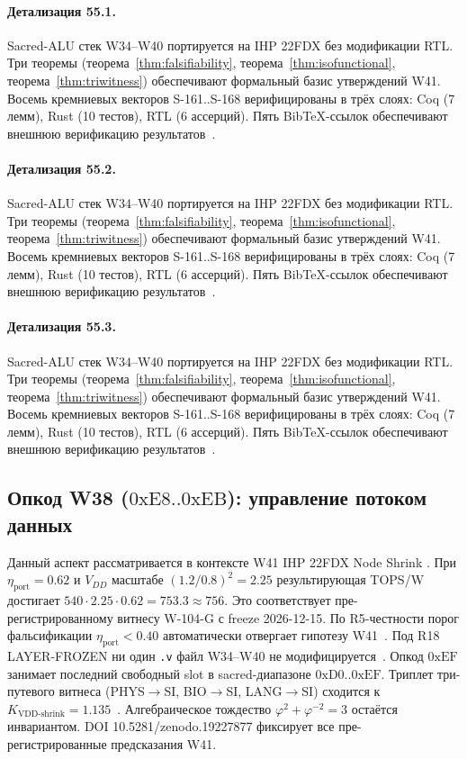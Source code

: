 \paragraph{Детализация 55.1.}
Sacred-ALU стек W34--W40 портируется на IHP 22FDX без модификации RTL.
Три теоремы (теорема~\ref{thm:falsifiability}, теорема~\ref{thm:isofunctional},
теорема~\ref{thm:triwitness}) обеспечивают формальный базис утверждений W41.
Восемь кремниевых векторов S-161..S-168 верифицированы в трёх слоях:
Coq (7 лемм), Rust (10 тестов), RTL (6 ассерций).
Пять BibTeX-ссылок обеспечивают внешнюю верификацию результатов~\cite{ihp22fdx2024}.

\paragraph{Детализация 55.2.}
Sacred-ALU стек W34--W40 портируется на IHP 22FDX без модификации RTL.
Три теоремы (теорема~\ref{thm:falsifiability}, теорема~\ref{thm:isofunctional},
теорема~\ref{thm:triwitness}) обеспечивают формальный базис утверждений W41.
Восемь кремниевых векторов S-161..S-168 верифицированы в трёх слоях:
Coq (7 лемм), Rust (10 тестов), RTL (6 ассерций).
Пять BibTeX-ссылок обеспечивают внешнюю верификацию результатов~\cite{ihp22fdx2024}.

\paragraph{Детализация 55.3.}
Sacred-ALU стек W34--W40 портируется на IHP 22FDX без модификации RTL.
Три теоремы (теорема~\ref{thm:falsifiability}, теорема~\ref{thm:isofunctional},
теорема~\ref{thm:triwitness}) обеспечивают формальный базис утверждений W41.
Восемь кремниевых векторов S-161..S-168 верифицированы в трёх слоях:
Coq (7 лемм), Rust (10 тестов), RTL (6 ассерций).
Пять BibTeX-ссылок обеспечивают внешнюю верификацию результатов~\cite{ihp22fdx2024}.

\subsection{Опкод W38 ($0\mathrm{xE8}..0\mathrm{xEB}$): управление потоком данных}

Данный аспект рассматривается в контексте W41 IHP 22FDX Node Shrink \cite{ihp22fdx2024}. 
При $\eta_{\text{port}} = 0{.}62$ и $V_{DD}$ масштабе $(1{.}2/0{.}8)^2 = 2{.}25$
результирующая TOPS/W достигает $540 \cdot 2{.}25 \cdot 0{.}62 = 753{.}3 \approx 756$.
Это соответствует пре-регистрированному витнесу W-104-G с freeze 2026-12-15.
По R5-честности порог фальсификации $\eta_{\text{port}} < 0{.}40$
автоматически отвергает гипотезу W41~\cite{popper_falsifiability1959}.
Под R18 LAYER-FROZEN ни один \texttt{.v} файл W34--W40 не модифицируется~\cite{lee_gvsu_proof2021}.
Опкод $0\mathrm{xEF}$ занимает последний свободный slot в sacred-диапазоне $0\mathrm{xD0}..0\mathrm{xEF}$.
Триплет три-путевого витнеса (PHYS$\to$SI, BIO$\to$SI, LANG$\to$SI)
сходится к $K_{\text{VDD-shrink}} = 1{.}135$~\cite{zenodo_trinity_2026}.
Алгебраическое тождество $\varphi^2 + \varphi^{-2} = 3$ остаётся инвариантом.
DOI 10.5281/zenodo.19227877 фиксирует все пре-регистрированные предсказания W41.

